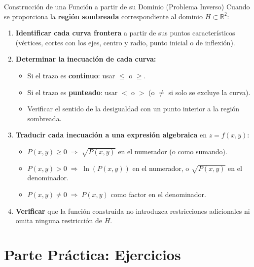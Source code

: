 \documentclass[aspectratio=169, 10pt]{beamer}
\begin{document}
\begin{frame}{Construcción de una Función a partir de su Dominio (Problema Inverso)}
  Cuando se proporciona la \textbf{región sombreada} correspondiente al dominio $H \subset \mathbb{R}^2$:

  \begin{enumerate}
    \item \textbf{Identificar cada curva frontera} a partir de sus puntos característicos (vértices, cortes con los ejes, centro y radio, punto inicial o de inflexión).
    \item \textbf{Determinar la inecuación de cada curva:}
      \begin{itemize}
        \item Si el trazo es \textbf{continuo}: usar $\le$ o $\ge$.
        \item Si el trazo es \textbf{punteado}: usar $<$ o $>$ (o $\neq$ si solo se excluye la curva).
        \item Verificar el sentido de la desigualdad con un punto interior a la región sombreada.
      \end{itemize}
    \item \textbf{Traducir cada inecuación a una expresión algebraica} en $z = f(x,y)$:
      \begin{itemize}
        \item $P(x,y) \ge 0 \;\Longrightarrow\; \sqrt{P(x,y)}$ en el numerador (o como sumando).
        \item $P(x,y) > 0 \;\Longrightarrow\; \ln(P(x,y))$ en el numerador, o $\sqrt{P(x,y)}$ en el denominador.
        \item $P(x,y) \neq 0 \;\Longrightarrow\; P(x,y)$ como factor en el denominador.
      \end{itemize}
    \item \textbf{Verificar} que la función construida no introduzca restricciones adicionales ni omita ninguna restricción de $H$.
  \end{enumerate}
\end{frame}

\section{Parte Práctica: Ejercicios}
\end{document}
